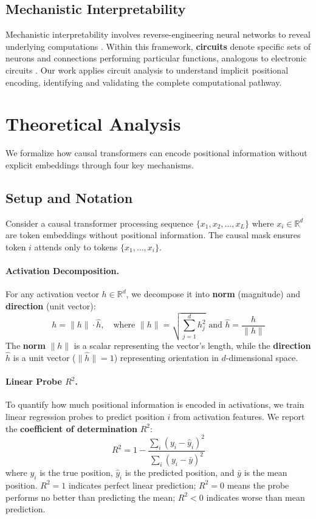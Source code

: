 \documentclass[11pt]{article}
\begin{document}
\subsection{Mechanistic Interpretability}
Mechanistic interpretability involves reverse-engineering neural networks to reveal underlying computations \citep{bricken2023monosemanticity, elhage2022toy}. Within this framework, \textbf{circuits} denote specific sets of neurons and connections performing particular functions, analogous to electronic circuits \citep{elhage2021mathematical, olsson2022context, conmy2023towards}. Our work applies circuit analysis to understand implicit positional encoding, identifying and validating the complete computational pathway.

\section{Theoretical Analysis}
We formalize how causal transformers can encode positional information without explicit embeddings through four key mechanisms.

\subsection{Setup and Notation}
Consider a causal transformer processing sequence $\{x_1, x_2, \ldots, x_L\}$ where $x_i \in \mathbb{R}^d$ are token embeddings without positional information. The causal mask ensures token $i$ attends only to tokens $\{x_1, \ldots, x_i\}$.

\paragraph{Activation Decomposition.} For any activation vector $h \in \mathbb{R}^d$, we decompose it into \textbf{norm} (magnitude) and \textbf{direction} (unit vector):
\begin{equation}
h = \|h\| \cdot \hat{h}, \quad \text{where } \|h\| = \sqrt{\sum_{j=1}^d h_j^2} \text{ and } \hat{h} = \frac{h}{\|h\|}
\end{equation}
The \textbf{norm} $\|h\|$ is a scalar representing the vector's length, while the \textbf{direction} $\hat{h}$ is a unit vector ($\|\hat{h}\|=1$) representing orientation in $d$-dimensional space.

\paragraph{Linear Probe $R^2$.} To quantify how much positional information is encoded in activations, we train linear regression probes to predict position $i$ from activation features. We report the \textbf{coefficient of determination} $R^2$:
\begin{equation}
R^2 = 1 - \frac{\sum_i (y_i - \hat{y}_i)^2}{\sum_i (y_i - \bar{y})^2}
\end{equation}
where $y_i$ is the true position, $\hat{y}_i$ is the predicted position, and $\bar{y}$ is the mean position. $R^2=1$ indicates perfect linear prediction; $R^2=0$ means the probe performs no better than predicting the mean; $R^2<0$ indicates worse than mean prediction.
\end{document}

